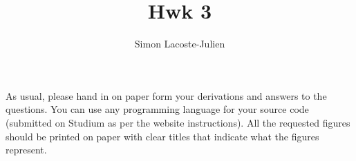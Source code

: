\documentclass[12pt]{article}
\title{Hwk 3}
\author{Simon Lacoste-Julien}
\newcommand{\1}{{\bf 1}}
\begin{document}
\fancyhead{}
\fancyfoot{}



As usual, please hand in on paper form your derivations and answers to the questions. You can use any programming language for your source code (submitted on Studium as per the website instructions). All the requested figures should be printed on paper with clear titles that indicate what the figures represent.
\end{document}

